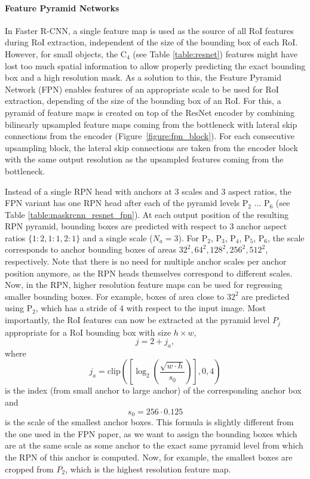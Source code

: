 \paragraph{Feature Pyramid Networks}
In Faster R-CNN, a single feature map is used as the source of all RoI features during RoI extraction, independent
of the size of the bounding box of each RoI.
However, for small objects, the C$_4$ (see Table \ref{table:resnet}) features
might have lost too much spatial information to allow properly predicting the exact bounding
box and a high resolution mask.
As a solution to this, the Feature Pyramid Network (FPN) \cite{FPN} enables features
of an appropriate scale to be used for RoI extraction, depending of the size of the bounding box of an RoI.
For this, a pyramid of feature maps is created on top of the ResNet \cite{ResNet}
encoder by combining bilinearly upsampled feature maps coming from the bottleneck
with lateral skip connections from the encoder (Figure~\ref{figure:fpn_block}).
For each consecutive upsampling block, the lateral skip connections are taken from
the encoder block with the same output resolution as the upsampled features coming
from the bottleneck.

Instead of a single RPN head with anchors at 3 scales and 3 aspect ratios,
the FPN variant has one RPN head after each of the pyramid levels P$_2$ ... P$_6$ (see Table \ref{table:maskrcnn_resnet_fpn}).
At each output position of the resulting RPN pyramid, bounding boxes are predicted
with respect to 3 anchor aspect ratios $\{1:2, 1:1, 2:1\}$ and a single scale ($N_a = 3$).
For P$_2$, P$_3$, P$_4$, P$_5$, P$_6$,
the scale corresponds to anchor bounding boxes of areas $32^2, 64^2, 128^2, 256^2, 512^2$,
respectively.
Note that there is no need for multiple anchor scales per anchor position anymore,
as the RPN heads themselves correspond to different scales.
Now, in the RPN, higher resolution feature maps can be used for regressing smaller
bounding boxes. For example, boxes of area close to $32^2$ are predicted using P$_2$,
which has a stride of $4$ with respect to the input image.
Most importantly, the RoI features can now be extracted at the pyramid level $P_j$ appropriate for a
RoI bounding box with size $h \times w$,
\begin{equation}
j = 2 + j_a,
\end{equation}
where
\begin{equation}
j_a = \mathrm{clip}\left(\left[\log_2\left(\frac{\sqrt{w \cdot h}}{s_0}\right)\right], 0, 4\right)
\label{eq:level_assignment}
\end{equation}
is the index (from small anchor to large anchor) of the corresponding anchor box and
\begin{equation}
s_0 = 256 \cdot 0.125
\label{eq:level_assignment}
\end{equation}
is the scale of the smallest anchor boxes.
This formula is slightly different from the one used in the FPN paper,
as we want to assign the bounding boxes which are at the same scale
as some anchor to the exact same pyramid level from which the RPN of this
anchor is computed. Now, for example, the smallest boxes are cropped from $P_2$,
which is the highest resolution feature map.


